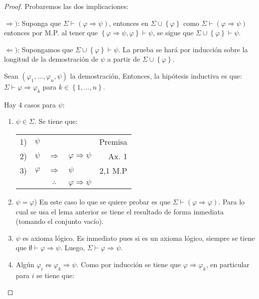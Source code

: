 \documentclass[12pt]{report}
\newcounter{it}
\theoremstyle{largebreak}
\begin{document}
    \begin{proof}
        Probaremos las dos implicaciones:

        $\Rightarrow)$: Suponga que $\Sigma\vdash(\varphi\Rightarrow\psi)$, entonces en $\Sigma\cup\left\{\varphi\right\}$ como $\Sigma\vdash(\varphi\Rightarrow\psi)$ entonces por M.P. al tener que $\left\{\varphi\Rightarrow\psi,\varphi \right\}\vdash\psi$, se sigue que $\Sigma\cup\left\{\varphi\right\}\vdash\psi$.

        $\Leftarrow)$: Supongamos que $\Sigma\cup\left\{\varphi\right\}\vdash\psi$. La prueba se hará por inducción sobre la longitud de la demostración de $\psi$ a partir de $\Sigma\cup\left\{\varphi \right\}$.

        Sean $(\varphi_1,...,\varphi_n,\psi)$ la demostración, Entonces, la hipótesis inductiva es que: $\Sigma\vdash \varphi\Rightarrow\varphi_k$ para $k\in\left\{1,...,n\right\}$.

        Hay 4 casos para $\psi$:
        \begin{enumerate}
            \item $\psi\in\Sigma$. Se tiene que:
            \begin{center}
                \begin{tabular}{l l c l r}
                    1) & $\psi$ &  &  & Premisa \\
                    2) & $\psi$ & $\Rightarrow$ & $\varphi\Rightarrow\psi$ & Ax. 1 \\
                    3) & $\varphi$ & $\Rightarrow$ & $\psi$ & 2,1 M.P \\
                    \hline
                    & & $\therefore$ & $\varphi\Rightarrow\psi$ & \\
                \end{tabular}
            \end{center}

            \item $\psi=\varphi$) En este caso lo que se quiere probar es que $\Sigma\vdash(\varphi\Rightarrow\varphi)$. Para lo cual se usa el lema anterior se tiene el resultado de forma inmediata (tomando el conjunto vacío).
            
            \item $\psi$ es axioma lógico. Es inmediato pues si es un axioma lógico, siempre se tiene que $ \emptyset\vdash \varphi\Rightarrow\psi$. Luego, $\Sigma\vdash\varphi\Rightarrow\psi$.
            
            \item Algún $\varphi_i$ es $\varphi_k\Rightarrow\psi$. Como por inducción se tiene que $\varphi\Rightarrow\varphi_k$, en particular para $i$ se tiene que:
            

\end{enumerate}
\end{proof}
\end{document}
